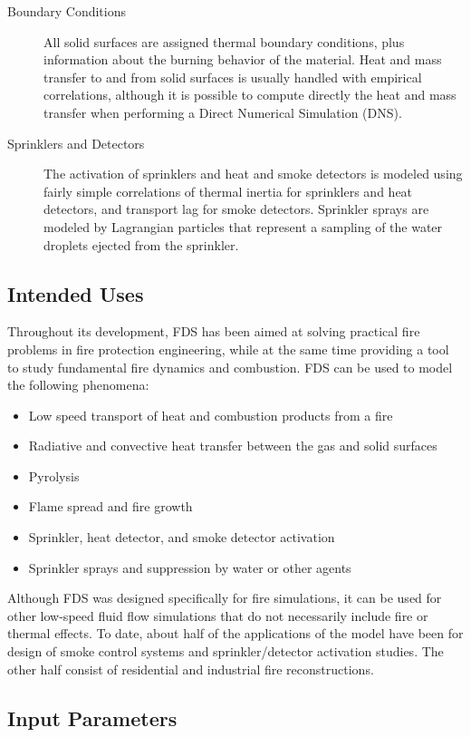 \documentclass[11pt]{book}
\begin{document}
\begin{description}
\item[Boundary Conditions] All solid surfaces are assigned thermal boundary conditions, plus information about the burning behavior of the material. Heat and mass transfer to and from solid surfaces is usually handled with empirical correlations, although it is possible to compute directly the heat and mass transfer when performing a Direct Numerical Simulation (DNS).
\item[Sprinklers and Detectors] The activation of sprinklers and heat and smoke detectors is modeled using fairly simple correlations of thermal inertia for sprinklers and heat detectors, and transport lag for smoke detectors. Sprinkler sprays are modeled by Lagrangian particles that represent a sampling of the water droplets ejected from the sprinkler.
\end{description}


\subsection{Intended Uses}

Throughout its development, FDS has been aimed at solving practical fire problems in fire protection engineering, while at the same time providing a
tool to study fundamental fire dynamics and combustion. FDS can be used to model the following phenomena:
\begin{itemize}
\setlength{\itemsep}{0.0in}
\item Low speed transport of heat and combustion products from a fire
\item Radiative and convective heat transfer between the gas and solid surfaces
\item Pyrolysis
\item Flame spread and fire growth
\item Sprinkler, heat detector, and smoke detector activation
\item Sprinkler sprays and suppression by water or other agents
\end{itemize}
Although FDS was designed specifically for fire simulations, it can be used for other low-speed fluid flow simulations that do not necessarily include fire or thermal effects. To date, about half of the applications of the model have been for design of smoke control systems and sprinkler/detector activation studies. The other half consist of residential and industrial fire reconstructions.


\subsection{Input Parameters}
\end{document}
